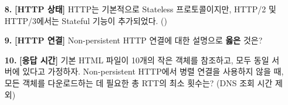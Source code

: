 \documentclass[a4paper, 10pt]{article}
\newcommand{\sectionbox}[1]{
  \vspace{0.5em}
  \noindent\fbox{\textbf{#1}}
  \vspace{0.5em}
}
\begin{document}
\begin{enumerate}[itemsep=3em, leftmargin=2em, label={}]










\item[] \sectionbox{II. 웹 및 HTTP}



\item[\textbf{8.}] \textbf{[HTTP 상태]} HTTP는 기본적으로 Stateless 프로토콜이지만, HTTP/2 및 HTTP/3에서는 Stateful 기능이 추가되었다. (\hspace{1cm})



\item[\textbf{9.}] \textbf{[HTTP 연결]} Non-persistent HTTP 연결에 대한 설명으로 \textbf{옳은} 것은?






\item[\textbf{10.}] \textbf{[응답 시간]} 기본 HTML 파일이 10개의 작은 객체를 참조하고, 모두 동일 서버에 있다고 가정하자. Non-persistent HTTP에서 병렬 연결을 사용하지 않을 때, 모든 객체를 다운로드하는 데 필요한 총 RTT의 최소 횟수는? (DNS 조회 시간 제외)




\end{enumerate}
\end{document}
